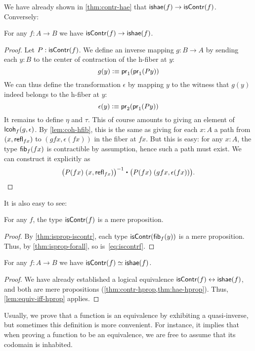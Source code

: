 We have already shown in \autoref{thm:contr-hae} that $\mathsf{ishae}(f) \to \mathsf{isContr}(f)$.
Conversely:

\begin{thm}\label{thm:lequiv-contr-hae}
For any $f:A\to B$ we have ${\mathsf{isContr}(f)} \to {\ensuremath{\mathsf{ishae}}(f)}$.
\end{thm}
\begin{proof}
Let $P : \mathsf{isContr}(f)$. We define an inverse mapping $g : B \to A$ by sending each $y : B$ to the center of contraction of the h-fiber at $y$:
\[ g(y) \vcentcolon\equiv \mathsf{pr}_{1}(\mathsf{pr}_{1}(Py)) \]
We can thus define the transformation $\epsilon$ by mapping $y$ to the witness that $g(y)$ indeed belongs to the h-fiber at $y$:
\[ \epsilon(y) \vcentcolon\equiv \mathsf{pr}_{2}(\mathsf{pr}_{1}(P y)) \]
It remains to define $\eta$ and $\tau$. This of course amounts to giving an element of $\mathsf{lcoh}_{f}(g,\epsilon)$. By \autoref{lem:coh-hfib}, this is the same as giving for each $x:A$ a path from $(x,\mathsf{refl}_{fx})$ to $(gfx,\epsilon(fx))$ in the fiber at $fx$. But this is easy: for any $x : A$, the type ${\mathsf{fib}}_{f}(fx)$ 
is contractible by assumption, hence such a path must exist. We can construct it explicitly as
\[\opp{\big(P(fx) \; (x,\refl{fx})\big)} \ct \big(P(fx) \; (gfx,\epsilon(fx))\big). \qedhere \]
\end{proof}

It is also easy to see:

\begin{lem}\label{thm:contr-hprop}
  For any $f$, the type $\mathsf{isContr}(f)$ is a mere proposition.
\end{lem}
\begin{proof}
  By \autoref{thm:isprop-iscontr}, each type $\mathsf{isContr} ({\mathsf{fib}}_{f}(y))$ is a mere proposition.
  Thus, by \autoref{thm:isprop-forall}, so is~\eqref{eq:iscontrf}.
\end{proof}

\begin{thm}\label{thm:equiv-contr-hae}
  For any $f:A\to B$ we have $\mathsf{isContr}(f) \simeq \mathsf{ishae}(f)$.
\end{thm}
\begin{proof}
  We have already established a logical equivalence ${\mathsf{isContr}(f)} \leftrightarrow {\ensuremath{\mathsf{ishae}}(f)}$, and both are mere propositions (\cref{thm:contr-hprop,thm:hae-hprop}).
  Thus, \autoref{lem:equiv-iff-hprop} applies.
\end{proof}

Usually, we prove that a function is an equivalence by exhibiting a quasi-inverse, but sometimes this definition is more convenient.
For instance, it implies that when proving a function to be an equivalence, we are free to assume that its codomain is inhabited.

